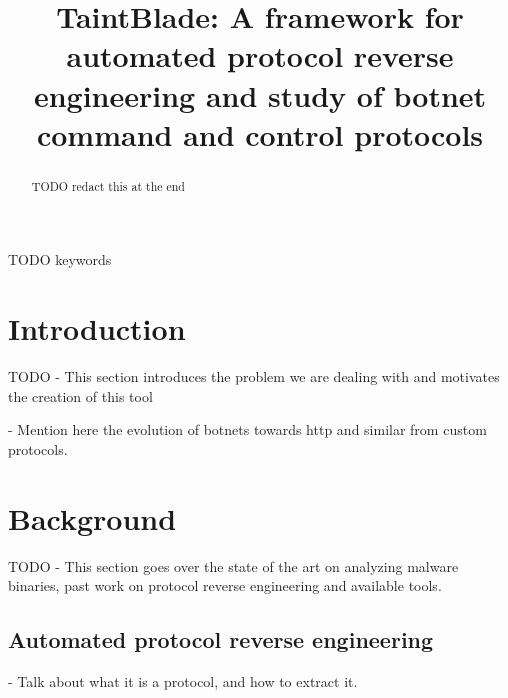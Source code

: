 \documentclass[conference]{IEEEtran}
\begin{document}
\title{TaintBlade: A framework for automated protocol reverse engineering and study of botnet command and control protocols
}

\author{
    \and
}

\maketitle

\begin{abstract}
    TODO redact this at the end
\end{abstract}

\begin{IEEEkeywords}
    TODO keywords
\end{IEEEkeywords}

\section{Introduction}
TODO - This section introduces the problem we are dealing with and motivates
the creation of this tool

- Mention here the evolution of botnets towards http and similar from custom protocols.

\section{Background}

TODO - This section goes over the state of the art on analyzing malware
binaries, past work on protocol reverse engineering and available tools.

\subsection{Automated protocol reverse engineering}
- Talk about what it is a protocol, and how to extract it.
\end{document}
